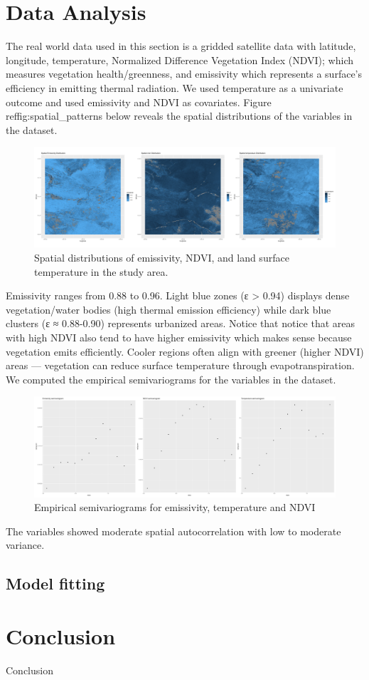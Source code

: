 \section{Data Analysis}
\label{sec:data analysis}
The real world data used in this section is a gridded satellite data with latitude, longitude, temperature, Normalized Difference Vegetation Index (NDVI); which measures vegetation health/greenness, and emissivity which represents a surface's efficiency in emitting thermal radiation. We used temperature as a univariate outcome and used emissivity and NDVI as covariates.
Figure ref{fig:spatial_patterns} below reveals the spatial  distributions of the variables in the dataset.
\begin{figure}[h]
\centering
\includegraphics[width=\textwidth]{figures/spatial_horizontal_stack.png}
\caption{
  Spatial distributions of emissivity, NDVI, and  land surface temperature in the study area. 
}
\label{fig:spatial_patterns}
\end{figure}

Emissivity ranges from 0.88 to 0.96. Light blue zones (ε > 0.94) displays dense vegetation/water bodies (high thermal emission efficiency)
while dark blue clusters (ε ≈ 0.88-0.90) represents urbanized areas. Notice that notice that areas with high NDVI also tend to have higher emissivity which makes sense because vegetation emits efficiently.
Cooler regions often align with greener (higher NDVI) areas — vegetation can reduce surface temperature through evapotranspiration. \newline
We computed the empirical semivariograms for the variables in the dataset. 
\begin{figure}[h]
\centering
\includegraphics[width=\textwidth]{figures/semivariograms.png}
\caption{Empirical semivariograms for emissivity, temperature and NDVI}
\label{fig:semivariograms}
\end{figure}
The variables showed moderate spatial autocorrelation with low to moderate variance.

\subsection{Model fitting}




\section{Conclusion}
Conclusion





